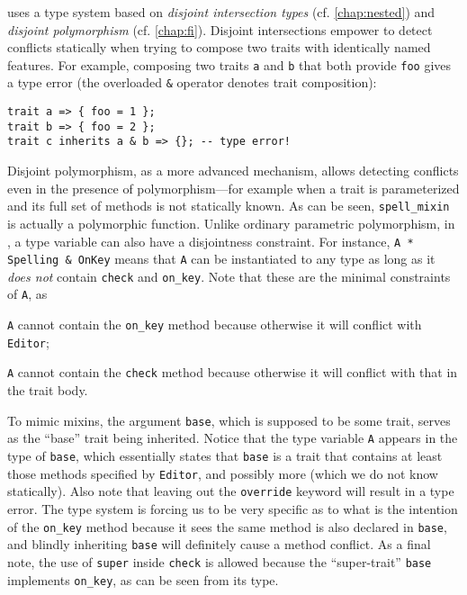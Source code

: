\sedel uses a type system based on \emph{disjoint intersection types} (cf. \cref{chap:nested}) and
\emph{disjoint polymorphism} (cf. \cref{chap:fi}). Disjoint intersections
empower \sedel to detect conflicts statically when trying to compose two
traits with identically named features. For example, composing two traits
\lstinline{a} and \lstinline{b} that both provide \lstinline{foo} gives a
type error (the overloaded \lstinline{&} operator denotes trait composition):
\begin{lstlisting}
trait a => { foo = 1 };
trait b => { foo = 2 };
trait c inherits a & b => {}; -- type error!
\end{lstlisting}
Disjoint polymorphism, as a more advanced mechanism, allows detecting conflicts
even in the presence of polymorphism---for example when a trait is parameterized and its
full set of methods is not statically known. As can be seen,
\lstinline{spell_mixin} is actually a polymorphic function. Unlike ordinary
parametric polymorphism, in \sedel, a type variable can also have a disjointness
constraint. For instance, \lstinline{A * Spelling & OnKey}
means that \lstinline{A} can be instantiated to any type as long as it \emph{does not}
contain \lstinline{check} and \lstinline{on_key}. Note that these are the minimal constraints of \lstinline{A}, as
\begin{inparaenum}[(1)]
  \item \lstinline{A} cannot contain the \lstinline{on_key} method because otherwise it will conflict with \lstinline{Editor};
  \item \lstinline{A} cannot contain the \lstinline{check} method because otherwise it will conflict with that in the trait body.
\end{inparaenum}
To mimic mixins, the
argument \lstinline{base}, which is supposed to be some trait, serves as the
``base'' trait being inherited. Notice that the type variable
\lstinline{A} appears in the type of \lstinline{base}, which essentially states
that \lstinline{base} is a trait that contains at least those methods specified
by \lstinline{Editor}, and possibly more (which we do not know statically).
Also note that leaving out the \lstinline{override} keyword will result in a
type error. The type system is forcing us to be very specific as to what is the
intention of the \lstinline{on_key} method because it sees the same method is
also declared in \lstinline{base}, and blindly inheriting \lstinline{base}
will definitely cause a method conflict. As a final note, the use of \lstinline{super}
inside \lstinline{check} is allowed because the ``super-trait'' \lstinline{base}
implements \lstinline{on_key}, as can be seen from its type.


